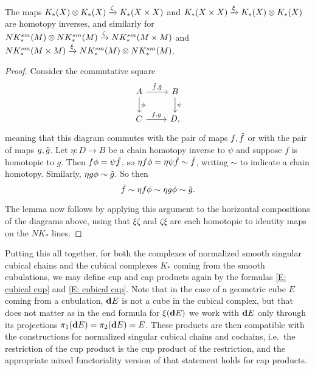 \begin{lemma}\label{L: EZ for cubical}
	The maps $K_*(X) \otimes K_*(X) \xrightarrow{\zeta}  K_*(X \times X)$ and $K_*(X \times X) \xrightarrow{\xi} K_*(X) \otimes K_*(X)$ are homotopy inverses, and similarly for $NK^{sm}_*(M) \otimes NK^{sm}_*(M) \xrightarrow{\zeta}  NK^{sm}_*(M \times M)$ and $NK^{sm}_*(M \times M) \xrightarrow{\xi} NK^{sm}_*(M) \otimes NK^{sm}_*(M) $.
\end{lemma}
\begin{proof}
	Consider the commutative square
	\[
	\begin{tikzcd}
	A \arrow[r,"\td f{,} \td g"]\arrow[d,"\phi"]& B\arrow[d,"\psi"]\\
	C \arrow[r,"f{,} g"]& D,
	\end{tikzcd}
	\]
	meaning that this diagram commutes with the pair of maps $f, \tilde f$ or with the pair of maps $g,\tilde g$.
	Let $\eta \colon D \to B$ be a chain homotopy inverse to $\psi$ and suppose $f$ is homotopic to $g$.
	Then $f \phi = \psi \tilde f$, so $\eta f \phi = \eta \psi \tilde f \sim \tilde f$, writing $\sim$ to indicate a chain homotopy.
	Similarly,  $\eta g \phi \sim \tilde g$.
	So then $$\tilde f \sim \eta f \phi  \sim \eta g \phi \sim \tilde g.$$

	The lemma now follows by applying this argument to the horizontal compositions of the diagrams above, using that $\xi \zeta$ and $\zeta \xi$ are each homotopic to identity maps on the $NK_*$ lines.
\end{proof}


Putting this all together, for both the complexes of normalized smooth singular cubical chains and the cubical complexes $K_*$ coming from the smooth cubulations, we may define cup and cap products again by the formulas \eqref{E: cubical cup} and \eqref{E: cubical cap}.
Note that in the case of a geometric cube $E$ coming from a cubulation, $\mathbf{d} E$ is not a cube in the cubical complex, but that does not matter as in the end formula for $\xi(\mathbf{d} E)$ we work with $\mathbf{d} E$ only through its projections $\pi_1(\mathbf{d} E) = \pi_2(\mathbf{d} E) = E$.
These products are then compatible with the constructions for normalized singular cubical chains and cochains, i.e.\ the restriction of the cup product is the cup product of the restriction, and the appropriate mixed functoriality version of that statement holds for cap products.

